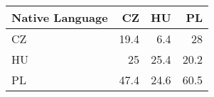 \begin{tabular}{lrrr}
\hline
 Native Language   &   CZ &   HU &   PL \\
\hline
 CZ                & 19.4 &  6.4 & 28   \\
 HU                & 25   & 25.4 & 20.2 \\
 PL                & 47.4 & 24.6 & 60.5 \\
\hline
\end{tabular}